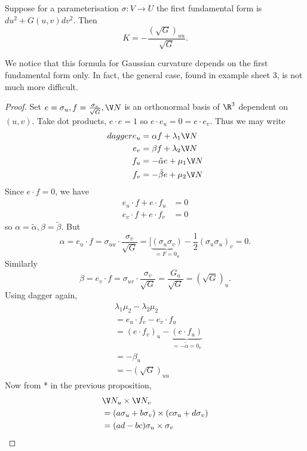 \documentclass[a4paper]{article}
\theoremstyle{definition}
\begin{document}
\begin{theorem}
  Suppose for a parameterisation \(\sigma: V \to U\) the first fundamental form is \(du^2 + G(u, v) dv^2\). Then
  \[
    K = -\frac{(\sqrt G)_{uu}}{\sqrt G}.
  \]
\end{theorem}
We notice that this formula for Gaussian curvature depends on the first fundamental form only. In fact, the general case, found in example sheet 3, is not much more difficult.

\begin{proof}
  Set \(e = \sigma_u, f = \frac{\sigma_v}{\sqrt G}, \V N\) is an orthonormal basis of \(\R^3\) dependent on \((u, v)\). Take dot products, \(e \cdot e = 1\) so \(e \cdot e_u = 0 = e \cdot e_v\). Thus we may write
  \begin{align*}
    dagger
    e_u &= \alpha f + \lambda_1 \V N \\
    e_v &= \beta f + \lambda_2 \V N \\
    f_u &= - \tilde \alpha e + \mu_1 \V N \\
    f_v &= - \tilde \beta e + \mu_2 \V N
  \end{align*}
  Since \(e \cdot f = 0\), we have
  \begin{align*}
    e_u \cdot f + e \cdot f_u &= 0 \\
    e_v \cdot f + e \cdot f_v &= 0
  \end{align*}
  so \(\alpha = \tilde \alpha, \beta = \tilde \beta\). But
  \[
    \alpha = e_u \cdot f = \sigma_{uu} \cdot \frac{\sigma_v}{\sqrt G} = [\underbrace{(\sigma_u \sigma_v)}_{= F = 0}_u - \frac{1}{2}(\sigma_u\sigma_u)_v = 0.
  \]
  Similarly
  \[
    \beta = e_v \cdot f = \sigma_{uv} \cdot \frac{\sigma_v}{\sqrt G} = \frac{G_u}{\sqrt G} = (\sqrt G)_u.
  \]
  Using dagger again,
  \begin{align*}
    & \lambda_1 \mu_2 - \lambda_2 \mu_2 \\
    &= e_u \cdot f_v - e_v \cdot f_u \\
    &= (e \cdot f_v)_u - \underbrace{(e \cdot f_u)}_{= -\tilde \alpha = 0}_v \\
    &= -\beta_u \\
    &= - (\sqrt G)_{uu}
  \end{align*}
  Now from * in the previous proposition,
  \begin{align*}
    & \V N_u \times \V N_v \\
    &= (a \sigma_u + b \sigma_v) \times (c \sigma_u + d \sigma_v) \\
    &= (ad - bc) \sigma_u \times \sigma_v \\

\end{align*}
\end{proof}
\end{document}
